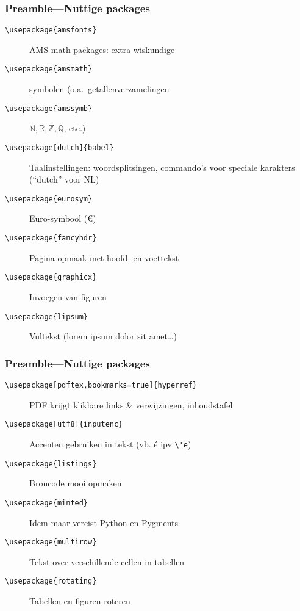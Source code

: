 \documentclass[aspectratio=169]{beamer}
\begin{document}
\begin{frame}[fragile]
  \frametitle{Preamble---Nuttige packages}

  \begin{description}
    \item[\texttt{\textbackslash{}usepackage\{amsfonts\}}] AMS math packages: extra wiskundige
    \item[\texttt{\textbackslash{}usepackage\{amsmath\}}] symbolen (o.a.\ getallenverzamelingen
    \item[\texttt{\textbackslash{}usepackage\{amssymb\}}] \(\mathbb{N}, \mathbb{R}, \mathbb{Z}, \mathbb{Q}\), etc.)
    \pause
    \item[\texttt{\textbackslash{}usepackage[dutch]\{babel\}}] Taalinstellingen: woordsplitsingen, commando's voor speciale karakters (``dutch'' voor NL)
    \pause
    \item[\texttt{\textbackslash{}usepackage\{eurosym\}}] Euro-symbool (\euro)
    \pause
    \item[\texttt{\textbackslash{}usepackage\{fancyhdr\}}] Pagina-opmaak met hoofd- en voettekst
    \pause
    \item[\texttt{\textbackslash{}usepackage\{graphicx\}}] Invoegen van figuren \pause
    \item[\texttt{\textbackslash{}usepackage\{lipsum\}}] Vultekst (lorem ipsum dolor sit amet\ldots)
  \end{description}
\end{frame}

\begin{frame}[fragile]
  \frametitle{Preamble---Nuttige packages}

  \begin{description}
    \item[\texttt{\textbackslash{}usepackage[pdftex,bookmarks=true]\{hyperref\}}] PDF krijgt klikbare links \& verwijzingen, inhoudstafel \pause
    \item[\texttt{\textbackslash{}usepackage[utf8]\{inputenc\}}] Accenten gebruiken in tekst (vb. é ipv \verb|\'e|) \pause
    \item[\texttt{\textbackslash{}usepackage\{listings\}}] Broncode mooi opmaken \pause
    \item[\texttt{\textbackslash{}usepackage\{minted\}}] Idem maar vereist Python en Pygments \pause
    \item[\texttt{\textbackslash{}usepackage\{multirow\}}] Tekst over verschillende cellen in tabellen \pause
    \item[\texttt{\textbackslash{}usepackage\{rotating\}}] Tabellen en figuren roteren
  \end{description}
\end{frame}
\end{document}
